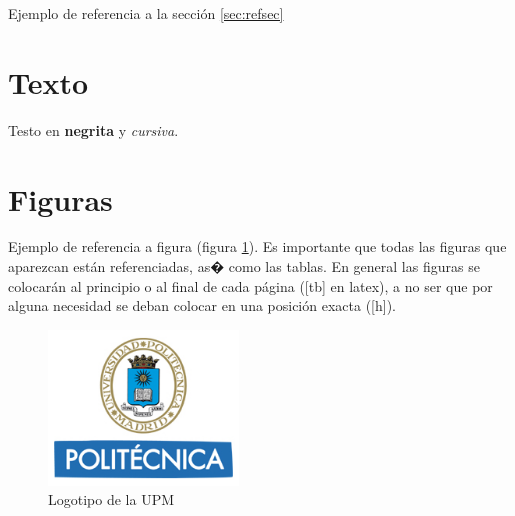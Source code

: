Ejemplo de referencia a la sección \ref{sec:refsec}

\section{Texto}

Testo en \textbf{negrita} y \textit{cursiva}.

\section{Figuras}

Ejemplo de referencia a figura (figura \ref{fig:logo_upm}). Es importante que todas las figuras que aparezcan están referenciadas, as� como las tablas. En general las figuras se colocarán al principio o al final de cada página ([tb] en latex), a no ser que por alguna necesidad se deban colocar en una posición exacta ([h]).

\begin{figure}[tb]
\centering
\includegraphics[width=0.45\textwidth]{figuras/Logo_UPM.jpg}   
\caption{Logotipo de la UPM}
\label{fig:logo_upm}
\end{figure}
